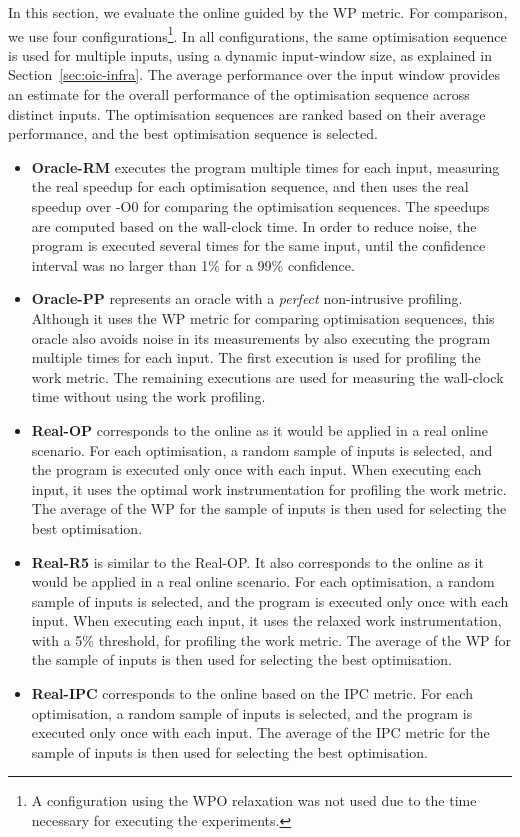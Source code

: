 In this section, we evaluate the online {\itercomp} guided by the WP metric.
For comparison, we use four configurations\footnote{A configuration using the WPO relaxation was not used due to the time necessary for executing the experiments.}.
In all configurations, the same optimisation sequence is used for multiple inputs, using a dynamic input-window size, as explained in Section~\ref{sec:oic-infra}.
The average performance over the input window provides an estimate for the overall performance of the optimisation sequence across distinct inputs.
The optimisation sequences are ranked based on their average performance, and the best optimisation sequence is selected.
\begin{itemize}
\item \textbf{Oracle-RM} executes the program multiple times for each input, measuring the real speedup for each optimisation sequence, and then uses the real speedup over {\flagstype -O0} for comparing the optimisation sequences.
  The speedups are computed based on the wall-clock time.
  In order to reduce noise, the program is executed several times for the same input, until the confidence interval was no larger than 1\% for a 99\% confidence.
\newpage
\item \textbf{Oracle-PP} represents an oracle with a \textit{perfect} non-intrusive profiling.
  Although it uses the WP metric for comparing optimisation sequences, this oracle also avoids noise in its measurements by also executing the program multiple times for each input.
  The first execution is used for profiling the work metric.
  The remaining executions are used for measuring the wall-clock time without using the work profiling.
\item \textbf{Real-OP} corresponds to the online {\itercomp} as it would be applied in a real online scenario.
  For each optimisation, a random sample of inputs is selected, and the program is executed only once with each input.
  When executing each input, it uses the optimal work instrumentation for profiling the work metric.
  The average of the WP for the sample of inputs is then used for selecting the best optimisation.
\item \textbf{Real-R5} is similar to the {Real-OP}.
  It also corresponds to the online {\itercomp} as it would be applied in a real online scenario.
  For each optimisation, a random sample of inputs is selected, and the program is executed only once with each input.
  When executing each input, it uses the relaxed work instrumentation, with a 5\% threshold, for profiling the work metric.
  The average of the WP for the sample of inputs is then used for selecting the best optimisation.
\item \textbf{Real-IPC} corresponds to the online {\itercomp} based on the IPC metric.
  For each optimisation, a random sample of inputs is selected, and the program is executed only once with each input.
  The average of the IPC metric for the sample of inputs is then used for selecting the best optimisation.
\end{itemize}
